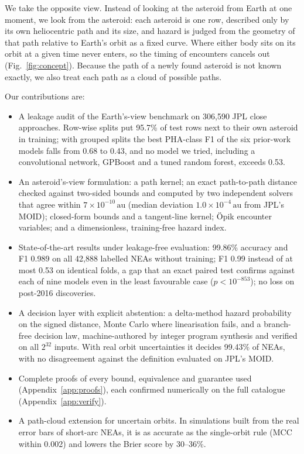 \documentclass[make,article,submit,moreauthors]{Definitions/mdpi}
\newcommand{\au}{\,\mathrm{au}}
\begin{document}
We take the opposite view. Instead of looking at the asteroid from Earth at one moment, we look from the asteroid: each asteroid is one row, described only by its own heliocentric path and its size, and hazard is judged from the geometry of that path relative to Earth's orbit as a fixed curve. Where either body sits on its orbit at a given time never enters, so the timing of encounters cancels out (Fig.~\ref{fig:concept}). Because the path of a newly found asteroid is not known exactly, we also treat each path as a cloud of possible paths.

Our contributions are:
\begin{itemize}
\item A leakage audit of the Earth's-view benchmark on 306,590 JPL close approaches. Row-wise splits put 95.7\% of test rows next to their own asteroid in training; with grouped splits the best PHA-class F1 of the six prior-work models falls from 0.68 to 0.43, and no model we tried, including a convolutional network, GPBoost and a tuned random forest, exceeds 0.53.
\item An asteroid's-view formulation: a path kernel; an exact path-to-path distance checked against two-sided bounds and computed by two independent solvers that agree within $7\times10^{-10}\au$ (median deviation $1.0\times10^{-4}\au$ from JPL's MOID); closed-form bounds and a tangent-line kernel; \"{O}pik encounter variables; and a dimensionless, training-free hazard index.
\item State-of-the-art results under leakage-free evaluation: 99.86\% accuracy and F1 0.989 on all 42,888 labelled NEAs without training; F1 0.99 instead of at most 0.53 on identical folds, a gap that an exact paired test confirms against each of nine models even in the least favourable case ($p<10^{-853}$); no loss on post-2016 discoveries.
\item A decision layer with explicit abstention: a delta-method hazard probability on the signed distance, Monte Carlo where linearisation fails, and a branch-free decision law, machine-authored by integer program synthesis and verified on all $2^{32}$ inputs. With real orbit uncertainties it decides 99.43\% of NEAs, with no disagreement against the definition evaluated on JPL's MOID.
\item Complete proofs of every bound, equivalence and guarantee used (Appendix~\ref{app:proofs}), each confirmed numerically on the full catalogue (Appendix~\ref{app:verify}).
\item A path-cloud extension for uncertain orbits. In simulations built from the real error bars of short-arc NEAs, it is as accurate as the single-orbit rule (MCC within 0.002) and lowers the Brier score by 30--36\%.
\end{itemize}
\end{document}
